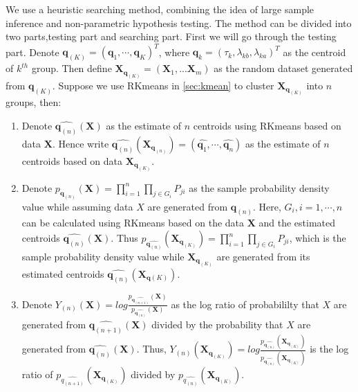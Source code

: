 \documentclass[12pt]{article}
\begin{document}
We use a heuristic searching method, combining the idea of large sample inference and non-parametric hypothesis testing. The method can be divided into two parts,testing part and searching part. First we will go through the testing part. Denote $\pmb q_{(K)}=(\pmb q_1,\cdots,\pmb q_K)^T$, where $\pmb q_k=(\tau_k,\lambda_{kb},\lambda_{ka})^T$ as the centroid of $k^{th}$ group. Then define $\pmb X_{\pmb q_{(K)}}=(\pmb X_1,...\pmb X_m)$ as the random dataset generated from $\pmb q_{(K)}$.  Suppose we use RKmeans in \ref{sec:kmean} to cluster $\pmb X_{\pmb q_{(K)}}$ into $n$ groups, then:
\begin{enumerate}[(1):]
\item Denote $\hat{\pmb q_{(n)}}(\pmb X)$ as the estimate of $n$ centroids using RKmeans based on data $\pmb X$. Hence write  $\hat{\pmb q_{(n)}}(\pmb X_{\pmb q_{(n)}})=(\hat{\pmb q_1},\cdots,\hat{\pmb q_{n}})$ as the estimate of $n$ centroids based on data $\pmb X_{\pmb q_{(K)}}$.

\item Denote $p_{\pmb q_{(n)}}(\pmb X)=\prod_{i=1}^{n}\prod_{j\in G_i}P_{ji} $ as the sample probability density value while assuming data $X$ are generated from $\pmb q_{(n)}$. Here, $G_i,i=1,\cdots,n$ can be calculated using RKmeans based on the data $\pmb X$ and the estimated centroids $\hat{\pmb q_{(n)}}(\pmb X)$. Thus $p_{\hat{\pmb q_{(n)}}}(\pmb X_{\pmb q_{(K)}})=\prod_{i=1}^{n}\prod_{j\in G_i}P_{ji} $, which is the sample probability density value while  $\pmb X_{\pmb q_{(K)}}$ are generated from its estimated centroids $\hat{\pmb q_{(n)}}(\pmb X_{\pmb q{(K)}})$.
  
\item Denote $Y_{(n)}(\pmb X)=log \frac{p_{\hat{\pmb q_{(n+1)}}}(\pmb X)}{p_{\hat{\pmb q_{(n)}}}(\pmb X)}$  as the log ratio of probabililty that $X$ are generated from $\hat{\pmb q_{(n+1)}}(\pmb X)$ divided by the probability that $X$ are generated from $\hat{\pmb q_{(n)}}(\pmb X)$. Thus, $Y_{(n)}(\pmb X_{\pmb q_{(K)}})=log \frac{p_{\hat{\pmb q_{(n)}}}(\pmb X_{\pmb q_{(K)}})}{p_{\hat{\pmb q_{(n)}}}(\pmb X_{\pmb q_{(K)}})}$ is the log ratio of  $p_{\hat{q_{(n+1)}}}(\pmb X_{\pmb q_{(K)}})$ divided by  $p_{\hat{q_{(n)}}}(\pmb X_{\pmb q_{(K)}})$.

\end{enumerate}
\end{document}
